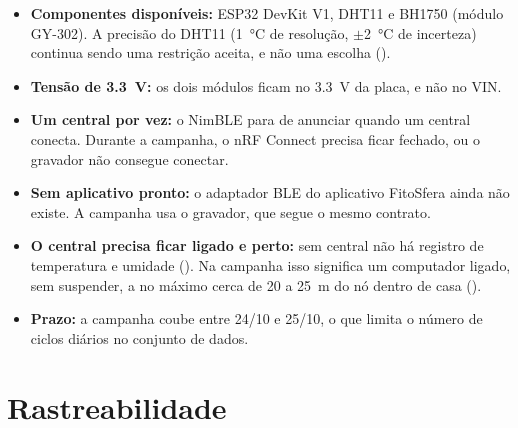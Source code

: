 \begin{itemize}
  \item \textbf{Componentes disponíveis:} ESP32 DevKit V1, DHT11 e
    BH1750 (módulo GY-302). A precisão do DHT11 (\SI{1}{\celsius} de
    resolução, $\pm$\SI{2}{\celsius} de incerteza) continua sendo uma
    restrição aceita, e não uma escolha ().
  \item \textbf{Tensão de \SI{3.3}{\volt}:} os dois módulos ficam no
    \SI{3.3}{\volt} da placa, e não no VIN.
  \item \textbf{Um central por vez:} o NimBLE para de anunciar quando um
    central conecta. Durante a campanha, o nRF Connect precisa ficar
    fechado, ou o gravador não consegue conectar.
  \item \textbf{Sem aplicativo pronto:} o adaptador BLE do aplicativo
    FitoSfera ainda não existe. A campanha usa o gravador, que segue o
    mesmo contrato.
  \item \textbf{O central precisa ficar ligado e perto:} sem central não
    há registro de temperatura e umidade (). Na campanha isso
    significa um computador ligado, sem suspender, a no máximo cerca de
    20 a \SI{25}{\metre} do nó dentro de casa ().
  \item \textbf{Prazo:} a campanha coube entre 24/10
    e 25/10, o que limita o número de ciclos diários no conjunto de dados.
\end{itemize}

\section{Rastreabilidade}
\label{sec:rastreabilidade}

